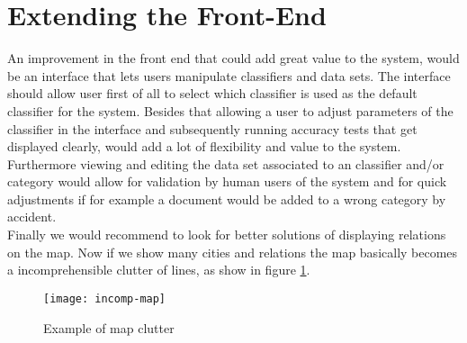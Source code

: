 \section{Extending the Front-End}
An improvement in the front end that could add great value to the system, would be an interface that lets users manipulate classifiers and data sets. The interface should allow user first of all to select which classifier is used as the default classifier for the system. Besides that allowing a user to adjust parameters of the classifier in the interface and subsequently running accuracy tests that get displayed clearly, would add a lot of flexibility and value to the system.\\
Furthermore viewing and editing the data set associated to an classifier and/or category would allow for validation by human users of the system and for quick adjustments if for example a document would be added to a wrong category by accident.\\
Finally we would recommend to look for better solutions of displaying relations on the map. Now if we show many cities and relations the map basically becomes a incomprehensible clutter of lines, as show in figure \ref{fig:incomp-map}.

\begin{figure}[H]
\centering
\texttt{[image: incomp-map]}
\caption{Example of map clutter}
\label{fig:incomp-map}
\end{figure}